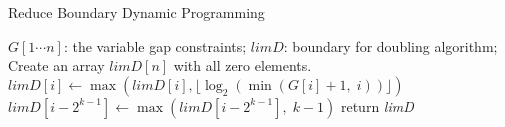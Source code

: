 \begin{algorithm}[!thb]
  \caption{Reduce Boundary Dynamic Programming}
  \label{alg:reduce-boundary}
  \begin{algorithmic}[1]
  \Require
      $G[1 \cdots n]$: the variable gap constraints;
  \Ensure
      $\textit{limD}$: boundary for doubling algorithm;
  \State Create an array $\textit{limD}[n]$ with all zero elements.
    \State $\textit{limD}[i] \gets \max(\textit{limD}[i], \lfloor \log_2(\min(G[i]+1, \; i)) \rfloor)$
      \State $\textit{limD}[i-2^{k-1}] \gets \max(\textit{limD}[i-2^{k-1}], \; k-1)$
    \EndFor
  \EndFor
  \State return \textit{limD}
  \end{algorithmic}
\end{algorithm}